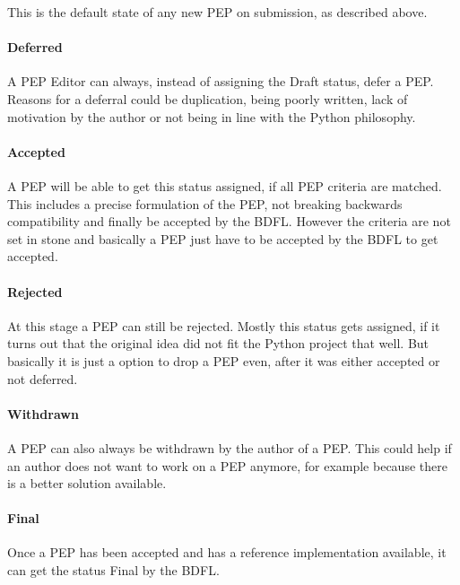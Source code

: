 This is the default state of any new \ac{PEP} on submission, as described
above.

\paragraph{Deferred}

A \ac{PEP} Editor can always, instead of assigning the Draft status, defer a
\ac{PEP}. Reasons for a deferral could be duplication, being poorly written,
lack of motivation by the author or not being in line with the Python
philosophy.

\paragraph{Accepted}

A \ac{PEP} will be able to get this status assigned, if all \ac{PEP} criteria
are matched. This includes a precise formulation of the \ac{PEP}, not breaking
backwards compatibility and finally be accepted by the \ac{BDFL}. However the
criteria are not set in stone and basically a \ac{PEP} just have to be accepted
by the \ac{BDFL} to get accepted.

\paragraph{Rejected}

At this stage a \ac{PEP} can still be rejected. Mostly this status gets
assigned, if it turns out that the original idea did not fit the Python project
that well. But basically it is just a option to drop a \ac{PEP} even, after it
was either accepted or not deferred.

\paragraph{Withdrawn}

A \ac{PEP} can also always be withdrawn by the author of a \ac{PEP}. This could
help if an author does not want to work on a \ac{PEP} anymore, for example
because there is a better solution available.

\paragraph{Final}

Once a \ac{PEP} has been accepted and has a reference implementation available,
it can get the status Final by the \ac{BDFL}.

